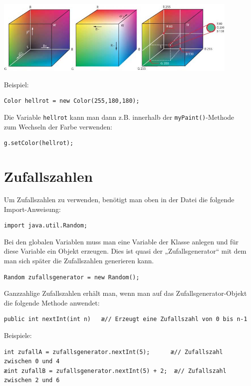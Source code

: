 \begin{center}
\includegraphics[width=0.9\textwidth]{./inf/SEKII/09_Java_Farben_und_Zufall/RGB_farbwuerfel.jpg}
\end{center}

Beispiel:

\begin{lstlisting}
Color hellrot = new Color(255,180,180);
\end{lstlisting}

Die Variable \lstinline|hellrot| kann man dann z.B. innerhalb der
\lstinline|myPaint()|-Methode zum Wechseln der Farbe verwenden:

\begin{lstlisting}
g.setColor(hellrot);
\end{lstlisting}


\section{Zufallszahlen}

\begin{compactenum}[a)]
\item Um Zufallszahlen zu verwenden, benötigt man oben in der Datei die folgende
 Import-Anweisung:

\begin{lstlisting}
import java.util.Random;
\end{lstlisting}

\item Bei den globalen Variablen muss man eine Variable der Klasse
 anlegen und für diese Variable ein Objekt erzeugen. Dies ist
quasi der „Zufallsgenerator“ mit dem man sich später die Zufallszahlen
generieren kann.

\begin{lstlisting}
Random zufallsgenerator = new Random();
\end{lstlisting}

\item Ganzzahlige Zufallszahlen erhält man, wenn man auf das
Zufallsgenerator-Objekt die folgende Methode anwendet:

\begin{lstlisting}
public int nextInt(int n)   æ// Erzeugt eine Zufallszahl von 0 bis n-1
\end{lstlisting}

Beispiele:

\begin{lstlisting}
int zufallA = zufallsgenerator.nextInt(5);      æ// Zufallszahl zwischen 0 und 4
æint zufallB = zufallsgenerator.nextInt(5) + 2;  æ// Zufallszahl zwischen 2 und 6
\end{lstlisting}
\end{compactenum}
